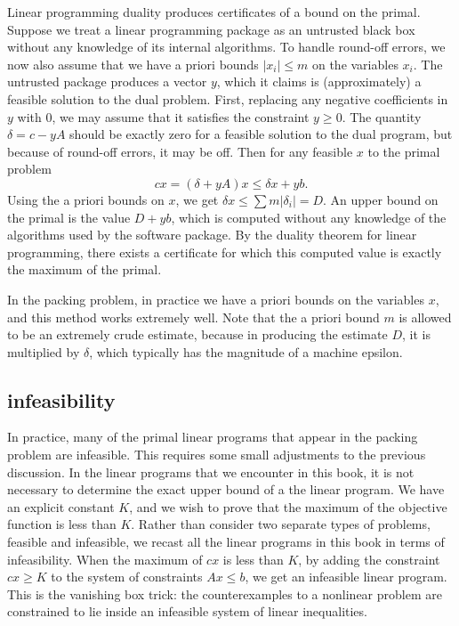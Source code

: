 Linear programming duality produces certificates of a bound
on the primal.  Suppose we treat a linear programming package as
an untrusted 
black box without any knowledge of its internal algorithms.
To handle round-off errors, we now also assume that we have
a priori bounds $|x_i| \le m$ on the variables $x_i$.
The untrusted package produces a vector $y$, which it claims
is (approximately) a feasible solution to the dual problem.  
First, replacing
any negative coefficients in $y$ with $0$, we may assume that
it satisfies the constraint $y\ge 0$.  The quantity $\delta = c - y A$
should be exactly zero for a feasible solution to the dual program, but
because of round-off errors, it may be  off.  
Then for any feasible $x$ to the primal problem
$$
c x = (\delta + y A)  x \le \delta  x + y b.
$$
Using the a priori bounds on $x$, we get $\delta x\le \sum 
m|\delta_i|=D$.  An upper bound on the primal is the value
$D + y b$, which is computed without any knowledge of the
algorithms used by the software package.  By the duality theorem
for linear programming, there exists a certificate for which this
computed value is exactly the maximum of the primal.

In the packing problem, in practice we have a priori bounds
on the variables $x$, and this method works extremely well.  Note
that the a priori bound $m$ is allowed to be an extremely crude estimate,
because in producing the estimate $D$, it is multiplied by $\delta$,
which typically has the magnitude of a machine epsilon.

\subsection{infeasibility}


In practice, many of the primal linear programs that appear
in the packing problem are infeasible.  This requires
some small adjustments to the previous discussion.   In the
linear programs that we encounter in this book, it is not
necessary to determine the exact upper bound of a the linear program.
We have an explicit constant $K$, and we wish to prove that
the maximum of the objective function is less than $K$.
Rather
than consider two separate
types of problems, feasible and infeasible, we recast all the linear
programs in this book in terms of infeasibility.
When the maximum of $c x$ is less than $K$, by
adding the constraint $c x\ge K$ to the system of constraints
$A x\le b$,  we get an infeasible linear program.
This is the vanishing box trick:  the counterexamples to a nonlinear
problem are constrained to lie inside an infeasible system of linear
inequalities.



